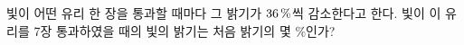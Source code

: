 빛이 어떤 유리 한 장을 통과할 때마다 그 밝기가 $36\mkern3mu \%$씩 감소한다고 한다. 빛이 이 유리를 7장 통과하였을 때의 빛의 밝기는 처음 밝기의 몇 $\%$인가? 
